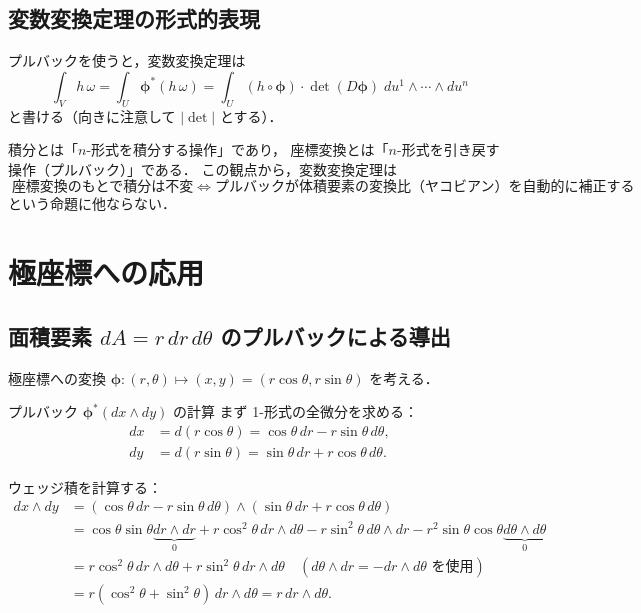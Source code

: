\documentclass[lualatex,ja=standard,a4paper,12pt]{bxjsarticle}
\begin{document}
\subsection{変数変換定理の形式的表現}

プルバックを使うと，変数変換定理は
\[
  \int_V h\,\omega = \int_U \boldsymbol{\phi}^*(h\,\omega)
  = \int_U (h \circ \boldsymbol{\phi})\cdot\det(D\boldsymbol{\phi})\; du^1\wedge\cdots\wedge du^n
\]
と書ける（向きに注意して $|\det|$ とする）．

積分とは「$n$-形式を積分する操作」であり，
座標変換とは「$n$-形式を引き戻す操作（プルバック）」である．
この観点から，変数変換定理は
\[
  \boxed{\text{座標変換のもとで積分は不変}\;\Leftrightarrow\;
         \text{プルバックが体積要素の変換比（ヤコビアン）を自動的に補正する}}
\]
という命題に他ならない．

\section{極座標への応用}

\subsection{面積要素 $dA = r\,dr\,d\theta$ のプルバックによる導出}

極座標への変換 $\boldsymbol{\phi}: (r, \theta) \mapsto (x, y) = (r\cos\theta, r\sin\theta)$ を考える．

\begin{derivbox}{プルバック $\boldsymbol{\phi}^*(dx\wedge dy)$ の計算}
まず 1-形式の全微分を求める：
\begin{align*}
  dx &= d(r\cos\theta) = \cos\theta\,dr - r\sin\theta\,d\theta, \\
  dy &= d(r\sin\theta) = \sin\theta\,dr + r\cos\theta\,d\theta.
\end{align*}

ウェッジ積を計算する：
\begin{align*}
  dx\wedge dy
  &= (\cos\theta\,dr - r\sin\theta\,d\theta)
     \wedge(\sin\theta\,dr + r\cos\theta\,d\theta) \\
  &= \cos\theta\sin\theta\underbrace{dr\wedge dr}_{0}
   + r\cos^2\theta\,dr\wedge d\theta
   - r\sin^2\theta\,d\theta\wedge dr
   - r^2\sin\theta\cos\theta\underbrace{d\theta\wedge d\theta}_{0} \\
  &= r\cos^2\theta\,dr\wedge d\theta
   + r\sin^2\theta\,dr\wedge d\theta
   \quad (d\theta\wedge dr = -dr\wedge d\theta \text{ を使用}) \\
  &= r(\cos^2\theta + \sin^2\theta)\,dr\wedge d\theta
   = r\,dr\wedge d\theta.
\end{align*}
\end{derivbox}
\end{document}
